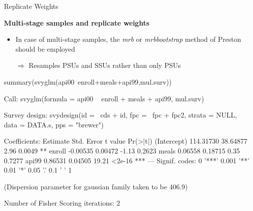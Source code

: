 \documentclass[11pt,german,hideothersubsections]{beamer}
\begin{document}
\begin{frame}[fragile]{Replicate Weights}
\footnotesize{
\begin{center}
\textbf{Multi-stage samples and replicate weights}
\end{center}
\begin{itemize}
\item In case of multi-stage samples, the \emph{mrb} or \emph{mrbbootstrap} method of Preston should be employed
\item[$\Rightarrow$] Resamples PSUs and SSUs rather than only PSUs
\end{itemize}
\tiny{
\begin{Schunk}
\begin{Sinput}
 summary(svyglm(api00~enroll+meals+api99,mul.surv))
\end{Sinput}
\begin{Soutput}
Call:
svyglm(formula = api00 ~ enroll + meals + api99, mul.surv)

Survey design:
svydesign(id = ~cds + id, fpc = ~fpc + fpc2, strata = NULL, data = DATA.s, 
    pps = "brewer")

Coefficients:
             Estimate Std. Error t value Pr(>|t|)    
(Intercept) 114.31730   38.64877    2.96   0.0049 ** 
enroll       -0.00535    0.00472   -1.13   0.2623    
meals         0.06558    0.18715    0.35   0.7277    
api99         0.86531    0.04505   19.21   <2e-16 ***
---
Signif. codes:  0 '***' 0.001 '**' 0.01 '*' 0.05 '.' 0.1 ' ' 1

(Dispersion parameter for gaussian family taken to be 406.9)

Number of Fisher Scoring iterations: 2
\end{Soutput}
\end{Schunk}
}

}
\end{frame}
\end{document}
